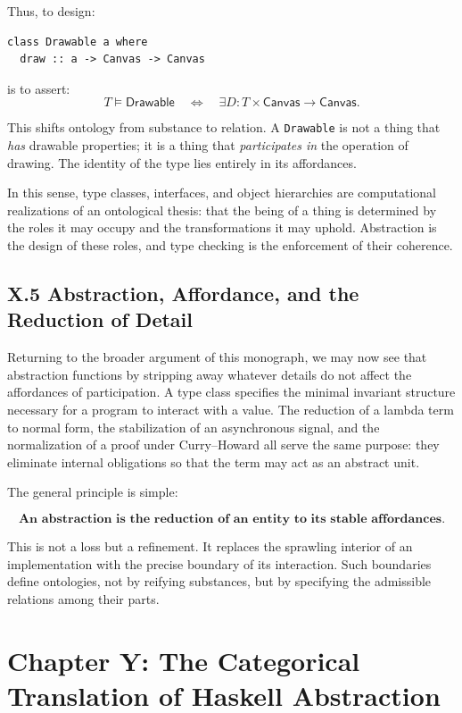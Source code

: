 \documentclass[11pt,letterpaper]{article}
\begin{document}
Thus, to design:
\begin{verbatim}
class Drawable a where
  draw :: a -> Canvas -> Canvas
\end{verbatim}
is to assert:
\[
T \vDash \mathsf{Drawable} 
\quad \iff \quad 
\exists D : T \times \mathsf{Canvas} \to \mathsf{Canvas}.
\]

This shifts ontology from substance to relation. A \texttt{Drawable} is not a thing that \emph{has} drawable properties; it is a thing that \emph{participates in} the operation of drawing. The identity of the type lies entirely in its affordances.

In this sense, type classes, interfaces, and object hierarchies are computational realizations of an ontological thesis: that the being of a thing is determined by the roles it may occupy and the transformations it may uphold. Abstraction is the design of these roles, and type checking is the enforcement of their coherence.

\subsection{X.5 Abstraction, Affordance, and the Reduction of Detail}

Returning to the broader argument of this monograph, we may now see that abstraction functions by stripping away whatever details do not affect the affordances of participation. A type class specifies the minimal invariant structure necessary for a program to interact with a value. The reduction of a lambda term to normal form, the stabilization of an asynchronous signal, and the normalization of a proof under Curry--Howard all serve the same purpose: they eliminate internal obligations so that the term may act as an abstract unit.

The general principle is simple:

\[
\textbf{An abstraction is the reduction of an entity to its stable affordances.}
\]

This is not a loss but a refinement. It replaces the sprawling interior of an implementation with the precise boundary of its interaction. Such boundaries define ontologies, not by reifying substances, but by specifying the admissible relations among their parts.

\newpage

\section{Chapter Y: The Categorical Translation of Haskell Abstraction}
\end{document}
